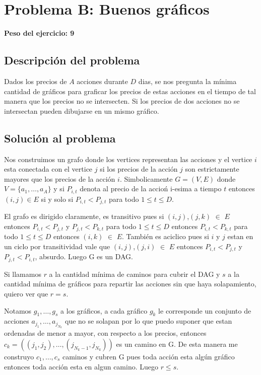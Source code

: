 \newpage{}
\section{Problema B: Buenos gráficos}
\textbf{Peso del ejercicio: 9}
\subsection{Descripción del problema}
	Dados los precios de $A$ acciones durante $D$ dias, se nos 
	pregunta la mínima cantidad de gráficos para graficar los 
	precios de estas acciones en el tiempo de tal manera que 
	los precios no se intersecten. Si los precios de dos acciones
	no se intersectan pueden dibujarse en un mismo gráfico.
	
	
\subsection{Solución al problema}
	Nos construimos un grafo donde los vertices representan 
	las acciones y el vertice $i$ esta conectada con el vertice $j$ si
	los precios de la acci\'on $j$ son estrictamente mayores que los precios de la 
	acci\'on $i$. Simbolicamente $G=(V,E)$ donde $V=\{a_1,\dots ,a_A\}$ y si
	$P_{i,t}$ denota al precio de la accio\'n i-esima a tiempo $t$ entonces
	$(i,j) \in E$ si y solo si $P_{i,t}<P_{j,t}$ para todo $1\leq t\leq D$.
	
	
	
	El grafo es dirigido claramente, es transitivo pues si $(i,j)$,$(j,k)$ $\in$ $E$
	entonces $P_{i,t}<P_{j,t}$ y $P_{j,t}<P_{k,t}$ para todo $1\leq t\leq D$ entonces
	$P_{i,t}<P_{k,t}$ para todo $1\leq t\leq D$ entonces $(i,k)$ $\in$ $E$. También
	es aciclico pues si $i$ y $j$ estan en un ciclo por transitividad
	vale que $(i,j)$,$(j,i)$ $\in$ $E$ entonces  $P_{i,t}<P_{j,t}$ y $P_{j,t}<P_{i,t}$, absurdo.
	Luego G es un DAG.
	
	
	Si llamamos $r$ a la cantidad mínima de caminos para cubrir el DAG
	y $s$ a la cantidad mínima de gráficos para repartir las acciones
	sin que haya solapamiento, quiero ver que $r=s$.
	
	Notamos $g_1,\dots ,g_s$ a los gráficos, a cada gráfico $g_k$ le corresponde
	un conjunto de acciones $a_{j_1},\dots ,a_{j_{N_k}}$ que no se solapan
	por lo que puedo suponer que estan ordenadas de menor a mayor, con respecto
	a los precios, entonces
	$c_k=((j_1,j_2),\dots ,(j_{N_k-1},j_{N_k}))$ es un camino en G. De esta manera me construyo
	$c_1,\dots ,c_s$ caminos y cubren G pues toda acción esta algún 
	gráfico entonces toda acción esta en algun camino.
	Luego $r\leq s$.
	
